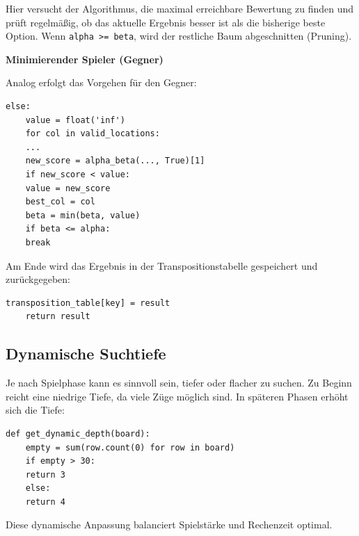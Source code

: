 Hier versucht der Algorithmus, die maximal erreichbare Bewertung zu finden und prüft regelmäßig, ob das aktuelle Ergebnis besser ist als die bisherige beste Option. Wenn \texttt{alpha >= beta}, wird der restliche Baum abgeschnitten (Pruning).

\textbf{Minimierender Spieler (Gegner)}

Analog erfolgt das Vorgehen für den Gegner:

\begin{lstlisting}[style=pythonstyle]
	else:
	value = float('inf')
	for col in valid_locations:
	...
	new_score = alpha_beta(..., True)[1]
	if new_score < value:
	value = new_score
	best_col = col
	beta = min(beta, value)
	if beta <= alpha:
	break
\end{lstlisting}

Am Ende wird das Ergebnis in der Transpositionstabelle gespeichert und zurückgegeben:

\begin{lstlisting}[style=pythonstyle]
	transposition_table[key] = result
	return result
\end{lstlisting}

\subsection*{Dynamische Suchtiefe}

Je nach Spielphase kann es sinnvoll sein, tiefer oder flacher zu suchen. Zu Beginn reicht eine niedrige Tiefe, da viele Züge möglich sind. In späteren Phasen erhöht sich die Tiefe:

\begin{lstlisting}[style=pythonstyle]
	def get_dynamic_depth(board):
	empty = sum(row.count(0) for row in board)
	if empty > 30:
	return 3
	else:
	return 4
\end{lstlisting}

Diese dynamische Anpassung balanciert Spielstärke und Rechenzeit optimal.



